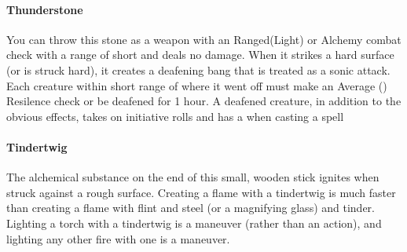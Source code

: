 \begin{multicols}{2}
\paragraph{Thunderstone} \label{alcitm:thunderstone}
You can throw this stone as a weapon with an Ranged(Light) or
Alchemy combat check with a range of short and deals no damage.
When it strikes a hard surface (or is struck hard), it creates
a deafening bang that is treated as a sonic attack. Each creature
within short range of where it went off must make an Average
(\difficulty\difficulty) Resilence check or be deafened for 1
hour. A deafened creature, in addition to the obvious effects,
takes \setback\setback on initiative rolls and has a \setback
when casting a spell

\paragraph{Tindertwig} \label{alcitm:tindertwig}
The alchemical substance on the end of this small,
wooden stick ignites when struck against a rough
surface. Creating a flame with a tindertwig is much
faster than creating a flame with flint and steel (or a
magnifying glass) and tinder. Lighting a torch with a
tindertwig is a maneuver (rather than an action), and
lighting any other fire with one is a maneuver.

\end{multicols}
